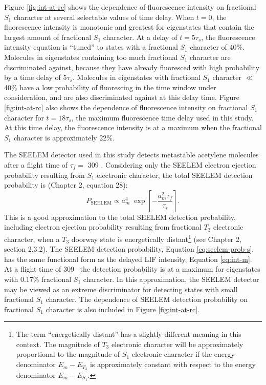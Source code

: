 Figure \ref{fig:int-at-rc} shows the dependence of fluorescence
intensity on fractional $S_1$ character at several selectable values
of time delay.  When $t = 0$, the fluorescence intensity is monotonic
and greatest for eigenstates that contain the largest amount of
fractional $S_1$ character.  At a delay of $t = 5 \tau_s$, the
fluorescence intensity equation is ``tuned'' to states with a
fractional $S_1$ character of 40\%.  Molecules in eigenstates
containing too much fractional $S_1$ character are discriminated
against, because they have already fluoresced with high probability by
a time delay of $5 \tau_s$.  Molecules in eigenstates with fractional
$S_1$ character $\ll$ 40\% have a low probability of fluorescing in
the time window under consideration, and are also discriminated
against at this delay time.  Figure \ref{fig:int-at-rc} also shows the
dependence of fluorescence intensity on fractional $S_1$ character for
$t=18\tau_s$, the maximum fluorescence time delay used in this study.
At this time delay, the fluorescence intensity is at a maximum when
the fractional $S_1$ character is approximately 22\%.

The SEELEM detector used in this study detects metastable acetylene
molecules after a flight time of $\tau_f =$ 309
\microsec.  Considering only the SEELEM electron ejection probability
resulting from $S_1$ electronic character, the total SEELEM detection
probability is (Chapter 2, equation 28):
\begin{equation}
  \label{eq:seelem-prob-s}
  P_{\text{SEELEM}} \propto 
    a_m^4 \; 
    \exp \left [ 
      -\frac{a_m^2 \tau_f}{\tau_s} 
    \right ].
\end{equation}
This is a good approximation to the total SEELEM detection
probability, including electron ejection probability resulting from
fractional $T_3$ electronic character, when a $T_3$ doorway state is
energetically distant\footnote{The term ``energetically distant'' has
  a slightly different meaning in this context. The magnitude of $T_3$
  electronic character will be approximately proportional to the
  magnitude of $S_1$ electronic character if the energy denominator
  $E_m - E_{T_3}$ is approximately constant with respect to the energy
  denominator $E_m - E_{S_1}$.} (see Chapter 2, section 2.3.2).  The
SEELEM detection probability, Equation \ref{eq:seelem-prob-s}, has the
same functional form as the delayed LIF intensity, Equation
\ref{eq:int-m}.  At a flight time of 309 \microsec\, the detection
probability is at a maximum for eigenstates with 0.17\% fractional
$S_1$ character.  In this approximation, the SEELEM detector may be
viewed as an extreme discriminator for detecting states with small
fractional $S_1$ character.  The dependence of SEELEM detection
probability on fractional $S_1$ character is also included in Figure
\ref{fig:int-at-rc}.




